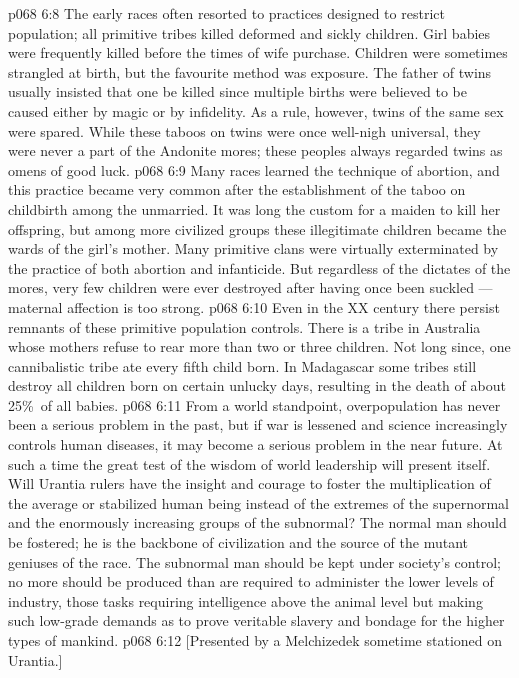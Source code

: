 \vs p068 6:8 The early races often resorted to practices designed to restrict population; all primitive tribes killed deformed and sickly children. Girl babies were frequently killed before the times of wife purchase. Children were sometimes strangled at birth, but the favourite method was exposure. The father of twins usually insisted that one be killed since multiple births were believed to be caused either by magic or by infidelity. As a rule, however, twins of the same sex were spared. While these taboos on twins were once well\hyp{}nigh universal, they were never a part of the Andonite mores; these peoples always regarded twins as omens of good luck.
\vs p068 6:9 Many races learned the technique of abortion, and this practice became very common after the establishment of the taboo on childbirth among the unmarried. It was long the custom for a maiden to kill her offspring, but among more civilized groups these illegitimate children became the wards of the girl’s mother. Many primitive clans were virtually exterminated by the practice of both abortion and infanticide. But regardless of the dictates of the mores, very few children were ever destroyed after having once been suckled --- maternal affection is too strong.
\vs p068 6:10 Even in the XX century there persist remnants of these primitive population controls. There is a tribe in Australia whose mothers refuse to rear more than two or three children. Not long since, one cannibalistic tribe ate every fifth child born. In Madagascar some tribes still destroy all children born on certain unlucky days, resulting in the death of about 25\%\ of all babies.
\vs p068 6:11 \pc From a world standpoint, overpopulation has never been a serious problem in the past, but if war is lessened and science increasingly controls human diseases, it may become a serious problem in the near future. At such a time the great test of the wisdom of world leadership will present itself. Will Urantia rulers have the insight and courage to foster the multiplication of the average or stabilized human being instead of the extremes of the supernormal and the enormously increasing groups of the subnormal? The normal man should be fostered; he is the backbone of civilization and the source of the mutant geniuses of the race. The subnormal man should be kept under society’s control; no more should be produced than are required to administer the lower levels of industry, those tasks requiring intelligence above the animal level but making such low\hyp{}grade demands as to prove veritable slavery and bondage for the higher types of mankind.
\vsetoff
\vs p068 6:12 [Presented by a Melchizedek sometime stationed on Urantia.]
